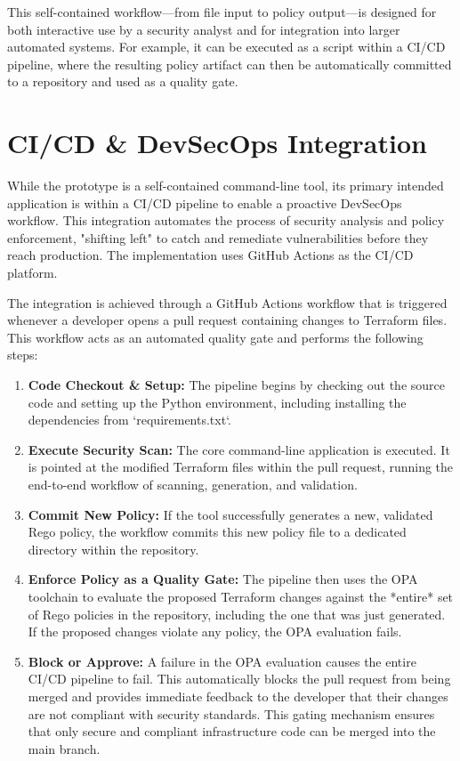This self-contained workflow—from file input to policy output—is designed for both interactive use by a security analyst and for integration into larger automated systems. For example, it can be executed as a script within a CI/CD pipeline, where the resulting policy artifact can then be automatically committed to a repository and used as a quality gate.

\section{CI/CD \& DevSecOps Integration}

While the prototype is a self-contained command-line tool, its primary intended application is within a CI/CD pipeline to enable a proactive DevSecOps workflow. This integration automates the process of security analysis and policy enforcement, "shifting left" to catch and remediate vulnerabilities before they reach production. The implementation uses GitHub Actions as the CI/CD platform.

The integration is achieved through a GitHub Actions workflow that is triggered whenever a developer opens a pull request containing changes to Terraform files. This workflow acts as an automated quality gate and performs the following steps:

\begin{enumerate}
    \item \textbf{Code Checkout \& Setup:} The pipeline begins by checking out the source code and setting up the Python environment, including installing the dependencies from `requirements.txt`.
    \item \textbf{Execute Security Scan:} The core command-line application is executed. It is pointed at the modified Terraform files within the pull request, running the end-to-end workflow of scanning, generation, and validation.
    \item \textbf{Commit New Policy:} If the tool successfully generates a new, validated Rego policy, the workflow commits this new policy file to a dedicated directory within the repository.
    \item \textbf{Enforce Policy as a Quality Gate:} The pipeline then uses the OPA toolchain to evaluate the proposed Terraform changes against the *entire* set of Rego policies in the repository, including the one that was just generated. If the proposed changes violate any policy, the OPA evaluation fails.
    \item \textbf{Block or Approve:} A failure in the OPA evaluation causes the entire CI/CD pipeline to fail. This automatically blocks the pull request from being merged and provides immediate feedback to the developer that their changes are not compliant with security standards. This gating mechanism ensures that only secure and compliant infrastructure code can be merged into the main branch.
\end{enumerate}

